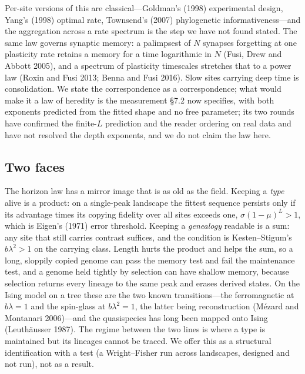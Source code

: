 \documentclass[11pt]{article}
\begin{document}
Per-site versions of this are classical---Goldman's (1998) experimental design, Yang's (1998) optimal rate, Townsend's (2007) phylogenetic informativeness---and the aggregation across a rate spectrum is the step we have not found stated. The same law governs synaptic memory: a palimpsest of $N$ synapses forgetting at one plasticity rate retains a memory for a time logarithmic in $N$ (Fusi, Drew and Abbott 2005), and a spectrum of plasticity timescales stretches that to a power law (Roxin and Fusi 2013; Benna and Fusi 2016). Slow sites carrying deep time is consolidation. We state the correspondence as a correspondence; what would make it a law of heredity is the measurement \S7.2 now specifies, with both exponents predicted from the fitted shape and no free parameter; its two rounds have confirmed the finite-$L$ prediction and the reader ordering on real data and have not resolved the depth exponents, and we do not claim the law here.

\subsection{Two faces}

The horizon law has a mirror image that is as old as the field. Keeping a \emph{type} alive is a product: on a single-peak landscape the fittest sequence persists only if its advantage times its copying fidelity over all sites exceeds one, $\sigma(1-\mu)^L>1$, which is Eigen's (1971) error threshold. Keeping a \emph{genealogy} readable is a sum: any site that still carries contrast suffices, and the condition is Kesten--Stigum's $b\lambda^2>1$ on the carrying class. Length hurts the product and helps the sum, so a long, sloppily copied genome can pass the memory test and fail the maintenance test, and a genome held tightly by selection can have shallow memory, because selection returns every lineage to the same peak and erases derived states. On the Ising model on a tree these are the two known transitions---the ferromagnetic at $b\lambda=1$ and the spin-glass at $b\lambda^2=1$, the latter being reconstruction (M\'ezard and Montanari 2006)---and the quasispecies has long been mapped onto Ising (Leuth\"ausser 1987). The regime between the two lines is where a type is maintained but its lineages cannot be traced. We offer this as a structural identification with a test (a Wright--Fisher run across landscapes, designed and not run), not as a result.
\end{document}
